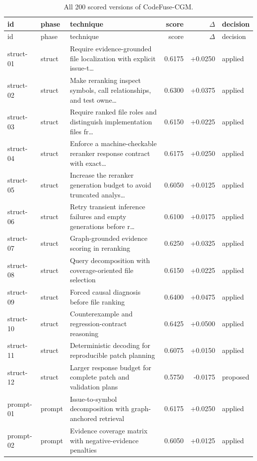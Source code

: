 \begin{center}\scriptsize\begin{longtable}{llp{5.2cm}rrl}
\caption{All 200 scored versions of CodeFuse-CGM.}\\
\toprule id & phase & technique & score & $\Delta$ & decision \\ \midrule \endfirsthead
\toprule id & phase & technique & score & $\Delta$ & decision \\ \midrule \endhead
struct-01 & struct & Require evidence-grounded file localization with explicit issue-t\ldots{} & 0.6175 & +0.0250 & applied \\
struct-02 & struct & Make reranking inspect symbols, call relationships, and test owne\ldots{} & 0.6300 & +0.0375 & applied \\
struct-03 & struct & Require ranked file roles and distinguish implementation files fr\ldots{} & 0.6150 & +0.0225 & applied \\
struct-04 & struct & Enforce a machine-checkable reranker response contract with exact\ldots{} & 0.6175 & +0.0250 & applied \\
struct-05 & struct & Increase the reranker generation budget to avoid truncated analys\ldots{} & 0.6050 & +0.0125 & applied \\
struct-06 & struct & Retry transient inference failures and empty generations before r\ldots{} & 0.6100 & +0.0175 & applied \\
struct-07 & struct & Graph-grounded evidence scoring in reranking & 0.6250 & +0.0325 & applied \\
struct-08 & struct & Query decomposition with coverage-oriented file selection & 0.6150 & +0.0225 & applied \\
struct-09 & struct & Forced causal diagnosis before file ranking & 0.6400 & +0.0475 & applied \\
struct-10 & struct & Counterexample and regression-contract reasoning & 0.6425 & +0.0500 & applied \\
struct-11 & struct & Deterministic decoding for reproducible patch planning & 0.6075 & +0.0150 & applied \\
struct-12 & struct & Larger response budget for complete patch and validation plans & 0.5750 & -0.0175 & proposed \\
prompt-01 & prompt & Issue-to-symbol decomposition with graph-anchored retrieval & 0.6175 & +0.0250 & applied \\
prompt-02 & prompt & Evidence coverage matrix with negative-evidence penalties & 0.6050 & +0.0125 & applied \\

\end{longtable}
\end{center}
